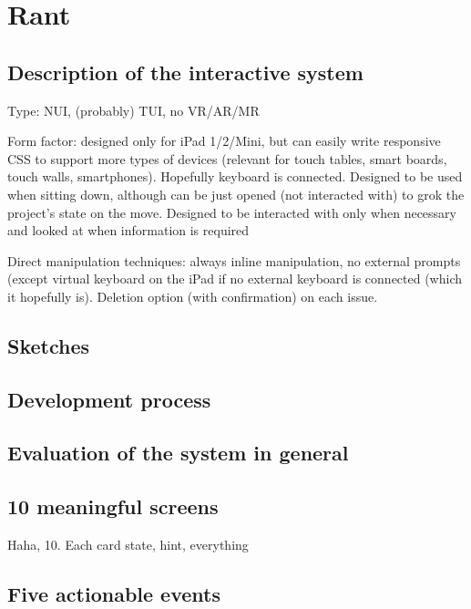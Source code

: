 \section{Rant}

\subsection{Description of the interactive system}

Type: NUI, (probably) TUI, no VR/AR/MR %

Form factor: designed only for iPad 1/2/Mini, but can easily write responsive CSS to support more types of devices (relevant for touch tables, smart boards, touch walls, smartphones). Hopefully keyboard is connected. Designed to be used when sitting down, although can be just opened (not interacted with) to grok the project's state on the move. Designed to be interacted with only when necessary and looked at when information is required

Direct manipulation techniques: always inline manipulation, no external prompts (except virtual keyboard on the iPad if no external keyboard is connected (which it hopefully is). Deletion option (with confirmation) on each issue.

\subsection{Sketches}

\subsection{Development process}

\subsection{Evaluation of the system in general}

\subsection{10 meaningful screens}

Haha, 10. Each card state, hint, everything


\subsection{Five actionable events}

